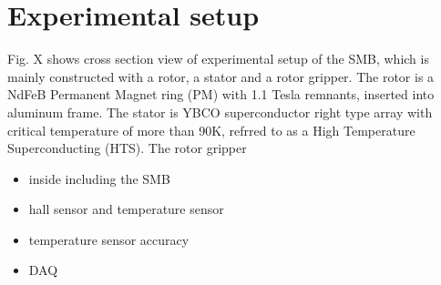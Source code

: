 \section{Experimental setup}

Fig. X shows cross section view of experimental setup of the SMB,
which is mainly constructed with a rotor, a stator and a rotor gripper.
The rotor is a NdFeB Permanent Magnet ring (PM) with 1.1 Tesla remnants,
inserted into aluminum frame.
The stator is YBCO superconductor right type array with critical temperature of more than 90K,
refrred to as a High Temperature Superconducting (HTS).
The rotor gripper

\begin{itemize}
\item inside including the SMB
\item hall sensor and temperature sensor
\item temperature sensor accuracy
\item DAQ
\end{itemize}
